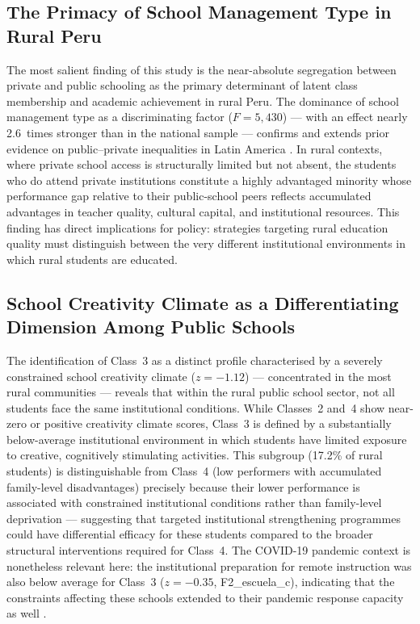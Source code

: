 \documentclass[twocolumn,12pt]{article}
\begin{document}
\subsection{The Primacy of School Management Type in Rural Peru}

The most salient finding of this study is the near-absolute segregation
between private and public schooling as the primary determinant of latent
class membership and academic achievement in rural Peru. The dominance of
school management type as a discriminating factor ($F = 5{,}430$) --- with
an effect nearly 2.6~times stronger than in the national sample --- confirms
and extends prior evidence on public--private inequalities in Latin America
\parencite{delprato2025schools}. In rural contexts, where private school
access is structurally limited but not absent, the students who do attend
private institutions constitute a highly advantaged minority whose
performance gap relative to their public-school peers reflects accumulated
advantages in teacher quality, cultural capital, and institutional resources.
This finding has direct implications for policy: strategies targeting rural
education quality must distinguish between the very different institutional
environments in which rural students are educated.

\subsection{School Creativity Climate as a Differentiating Dimension Among Public Schools}

The identification of Class~3 as a distinct profile characterised
by a severely constrained school creativity climate ($z = -1.12$)
--- concentrated in the most rural communities --- reveals that
within the rural public school sector, not all students face the
same institutional conditions. While Classes~2 and~4 show near-zero
or positive creativity climate scores, Class~3 is defined by a
substantially below-average institutional environment in which
students have limited exposure to creative, cognitively stimulating
activities. This subgroup (17.2\% of rural students) is
distinguishable from Class~4 (low performers with accumulated
family-level disadvantages) precisely because their lower
performance is associated with constrained institutional conditions
rather than family-level deprivation --- suggesting that targeted
institutional strengthening programmes could have differential
efficacy for these students compared to the broader structural
interventions required for Class~4. The COVID-19 pandemic context
is nonetheless relevant here: the institutional preparation for
remote instruction was also below average for Class~3
($z = -0.35$, F2\_escuela\_c), indicating that the constraints
affecting these schools extended to their pandemic response
capacity as well \parencite{delprato2025covid}.
\end{document}
